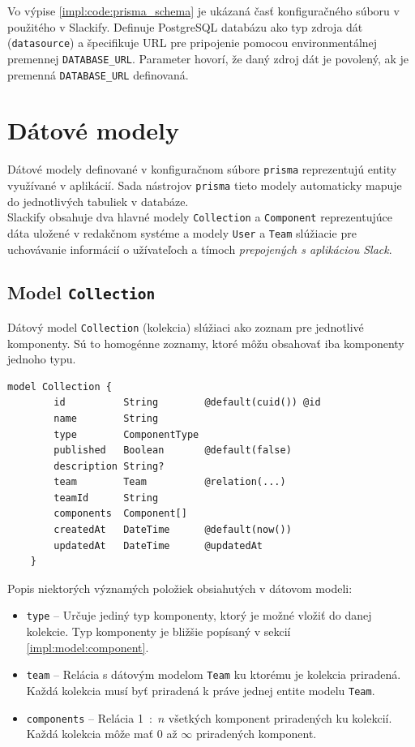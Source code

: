 \bigskip

\noindent Vo výpise \ref{impl:code:prisma_schema} je ukázaná časť konfiguračného súboru v použitého v Slackify. Definuje PostgreSQL databázu ako typ zdroja dát (\texttt{datasource}) a špecifikuje URL pre pripojenie pomocou environmentálnej premennej \texttt{DATABASE\_URL}. Parameter  hovorí, že daný zdroj dát je povolený, ak je premenná \texttt{DATABASE\_URL} definovaná.

\section{Dátové modely}
Dátové modely definované v konfiguračnom súbore \texttt{prisma} reprezentujú entity využívané v aplikácií. Sada nástrojov \texttt{prisma} tieto modely automaticky mapuje do jednotlivých tabuliek v databáze. \\

\noindent Slackify obsahuje dva hlavné modely \texttt{Collection} a \texttt{Component} reprezentujúce dáta uložené v redakčnom systéme a modely \texttt{User} a \texttt{Team} slúžiacie pre uchovávanie informácií o užívateľoch a tímoch \emph{prepojených s aplikáciou Slack}.

\subsection{Model \texttt{Collection}}
Dátový model \texttt{Collection} (kolekcia) slúžiaci ako zoznam pre jednotlivé komponenty. Sú to homogénne zoznamy, ktoré môžu obsahovať iba komponenty jednoho typu.\\

\begin{lstlisting}[caption=Dátový model \texttt{Collection} v konfiguračnom súbore \texttt{prisma}.]
	model Collection {
		id          String        @default(cuid()) @id
		name        String
		type        ComponentType
		published   Boolean       @default(false)
		description String?
		team        Team          @relation(...)
		teamId      String
		components  Component[]
		createdAt   DateTime      @default(now())
		updatedAt   DateTime      @updatedAt
	}
\end{lstlisting}

\bigskip

\noindent Popis niektorých významých položiek obsiahutých v dátovom modeli:

\begin{itemize}
	\item \texttt{type} -- Určuje jediný typ komponenty, ktorý je možné vložiť do danej kolekcie. Typ komponenty je bližšie popísaný v sekcií \ref{impl:model:component}.
	\item \texttt{team} -- Relácia s dátovým modelom \texttt{Team} ku ktorému je kolekcia priradená. Každá kolekcia musí byť priradená k práve jednej entite modelu \texttt{Team}.
	\item \texttt{components} -- Relácia 1~:~$n$ všetkých komponent priradených ku kolekcií. Každá kolekcia môže mať 0 až $\infty$ priradených komponent.
\end{itemize}

